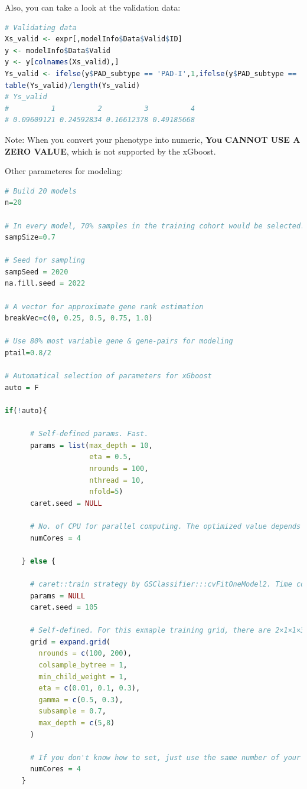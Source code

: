 \documentclass[
  12pt,
]{book}
\begin{document}
Also, you can take a look at the validation data:

\begin{lstlisting}[language=R]
# Validating data
Xs_valid <- expr[,modelInfo$Data$Valid$ID]
y <- modelInfo$Data$Valid
y <- y[colnames(Xs_valid),]
Ys_valid <- ifelse(y$PAD_subtype == 'PAD-I',1,ifelse(y$PAD_subtype == 'PAD-II',2,ifelse(y$PAD_subtype == 'PAD-III',3,ifelse(y$PAD_subtype == 'PAD-IV',4,NA))))
table(Ys_valid)/length(Ys_valid)
# Ys_valid
#          1          2          3          4 
# 0.09609121 0.24592834 0.16612378 0.49185668
\end{lstlisting}

Note: When you convert your phenotype into numeric, \textbf{You CANNOT USE A ZERO VALUE}, which is not supported by the xGboost.

Other parameteres for modeling:

\begin{lstlisting}[language=R]
# Build 20 models
n=20 

# In every model, 70% samples in the training cohort would be selected. 
sampSize=0.7

# Seed for sampling
sampSeed = 2020
na.fill.seed = 2022

# A vector for approximate gene rank estimation
breakVec=c(0, 0.25, 0.5, 0.75, 1.0)
  
# Use 80% most variable gene & gene-pairs for modeling
ptail=0.8/2

# Automatical selection of parameters for xGboost
auto = F

if(!auto){
      
      # Self-defined params. Fast.
      params = list(max_depth = 10,
                    eta = 0.5,
                    nrounds = 100,
                    nthread = 10,
                    nfold=5)
      caret.seed = NULL
      
      # No. of CPU for parallel computing. The optimized value depends on your CPU and RAM
      numCores = 4
      
    } else {
      
      # caret::train strategy by GSClassifier:::cvFitOneModel2. Time consuming
      params = NULL
      caret.seed = 105
      
      # Self-defined. For this exmaple training grid, there are 2×1×1×3×2×1×2=24 grids. Make sure that you have a computer with a powerfull CPU.
      grid = expand.grid(
        nrounds = c(100, 200),
        colsample_bytree = 1,
        min_child_weight = 1,
        eta = c(0.01, 0.1, 0.3),
        gamma = c(0.5, 0.3),
        subsample = 0.7,
        max_depth = c(5,8)
      )
      
      # If you don't know how to set, just use the same number of your subtypes
      numCores = 4 
    }
\end{lstlisting}
\end{document}
